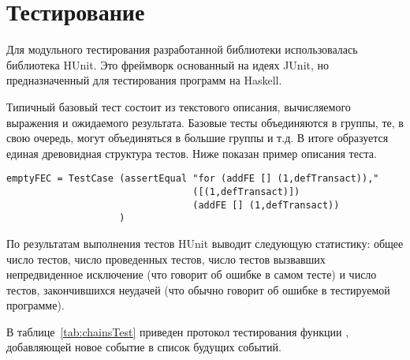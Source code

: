     





\section{Тестирование}

Для модульного тестирования разработанной библиотеки использовалась библиотека HUnit\cite{HUnit}. Это фреймворк основанный на идеях JUnit, но предназначенный для тестирования программ на Haskell.

Типичный базовый тест состоит из текстового описания, вычисляемого выражения и ожидаемого результата. Базовые тесты объединяются в группы, те, в свою очередь, могут объединяться в большие группы и т.д. В итоге образуется единая древовидная структура тестов. Ниже показан пример описания теста.

\begin{verbatim}
emptyFEC = TestCase (assertEqual "for (addFE [] (1,defTransact))," 
                                 ([(1,defTransact)]) 
                                 (addFE [] (1,defTransact))
                    )
\end{verbatim}

По результатам выполнения тестов HUnit выводит следующую статистику: общее число тестов, число проведенных тестов, число тестов вызвавших непредвиденное исключение (что говорит об ошибке в самом тесте) и число тестов, закончившихся неудачей (что обычно говорит об ошибке в тестируемой программе).

В таблице~\ref{tab:chainsTest} приведен протокол тестирования функции , добавляющей новое событие в список будущих событий.


